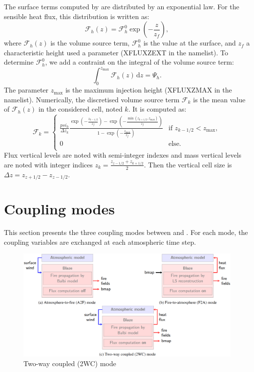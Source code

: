 The surface terms computed by \Blaze{} are distributed by an exponential law. For the sensible heat flux, this distribution is written as:
\begin{equation}
  \mathcal F_h (z) = \mathcal F_h^0 \exp \left ( - \frac{z}{z_f} \right ),
\end{equation}
where $\mathcal F_h (z)$ is the volume source term, $\mathcal F_h^0$ is the value at the surface, and $z_f$ a characteristic height used a parameter (XFLUXZEXT in the namelist). To determine $\mathcal F_h^0$, we add a contraint on the integral of the volume source term:
\begin{equation}
  \int_0^{z_{\mathrm{max}}} \mathcal F_h (z) \, \mathrm d z = \Psi_h.
\end{equation}
The parameter $z_{\mathrm{max}}$ is the maximum injection height (XFLUXZMAX in the namelist). Numerically, the discretised volume source term $\mathcal F_k$ is the mean value of $\mathcal F_h (z)$ in the considered cell, noted $k$. It is computed as:
\begin{equation}
\mathcal F_k =
\begin{cases}
\frac{psi_h}{\Delta z_k} \frac{\exp \left ( - \frac{z_{k-1/2}}{z_f} \right ) - \exp \left ( - \frac{\min \left ( z_{k+1/2},z_{\mathrm{max}} \right )}{z_f} \right )}{1 - \exp \left ( -\frac{z_{\mathrm{max}}}{z_f}\right )}  & \text{if } z_{k-1/2} < z_{\mathrm{max}}, \\
0 & \text{else}. \\
\end{cases}
\end{equation}
Flux vertical levels are noted with semi-integer indexes and mass vertical levels are noted with integer indices $z_k = \frac{z_{z - 1/2} + z_{k+1/2}}{2}$. Then the vertical cell size is $\Delta z = z_{z + 1/2} - z_{z - 1/2}$.



\section{Coupling modes}

This section presents the three coupling modes between \Blaze{} and \MNH.
For each mode, the coupling variables are exchanged at each atmospheric time step.

\begin{figure}
	\centering
	\includegraphics[width=\textwidth]{EPS/couplingmodes.png}
	\caption{Two-way coupled (2WC) mode}
  	\label{fig:2WCMode}
\end{figure}

